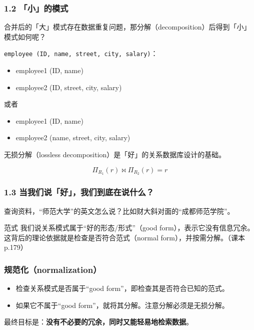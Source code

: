 \documentclass[aspectratio=169, 14pt]{beamer}
\begin{document}
\begin{frame}
    \frametitle{1.2 「小」的模式}
    合并后的「大」模式存在数据重复问题，那分解（decomposition）后得到「小」模式如何呢？

\texttt{employee (ID, name, street, city, salary)}：

\begin{itemize}
    \item employee1 (ID, name) 
    \item employee2 (ID, street, city, salary)
\end{itemize}

或者
\begin{itemize}
    \item employee1 (ID, name) 
    \item employee2 (name, street, city, salary)
\end{itemize}

\end{frame}

{
\begin{frame}[standout]
    无损分解（lossless decomposition）是「好」的关系数据库设计的基础。
    
    \[\Pi_{R_1}(r) \Join  \Pi_{R_2}(r) = r\]
\end{frame}
}

\begin{frame}
    \frametitle{1.3 当我们说「好」，我们到底在说什么？}

 查询资料，“师范大学”的英文怎么说？比如财大斜对面的“成都师范学院”。

\pause
\begin{exampleblock}{范式}
    我们说关系模式属于“好的形态/形式”（good form），表示它\alert{没有信息冗余}。这背后的理论依据就是检查是否符合\alert{范式}（normal form），并按需\alert{分解}。（课本p.179）    
\end{exampleblock}
\end{frame}

\begin{frame}
    \frametitle{规范化（normalization）}

    \begin{itemize}
        \item 检查关系模式是否属于“good form”，即检查其是否符合已知的范式。
        \item 如果它不属于“good form”，就将其分解。注意分解必须是无损分解。
    \end{itemize}

     最终目标是：\textbf{没有不必要的冗余，同时又能轻易地检索数据}。
\end{frame}
\end{document}
